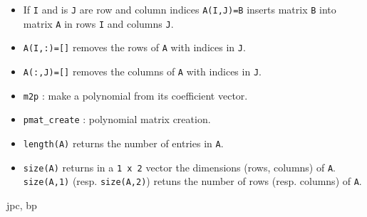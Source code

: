 \begin{itemize}
   \item If \verb+I+ and is \verb+J+ are row and column indices \verb+A(I,J)=B+ inserts
     matrix \verb+B+ into matrix \verb+A+ in rows \verb+I+ and columns \verb!J!.
   \item \verb+A(I,:)=[]+ removes the rows of \verb+A+ with indices in \verb+J+.
   \item \verb+A(:,J)=[]+ removes the columns of \verb+A+ with indices in \verb+J+.
\end{itemize}

\begin{itemize}
   \item \verb+m2p+ : make a polynomial from its coefficient vector.
   \item \verb+pmat_create+ : polynomial matrix creation.
   \item \verb+length(A)+ returns the number of entries in \verb+A+.
   \item \verb+size(A)+ returns in a \verb+1 x 2+ vector the dimensions (rows, columns)
     of \verb+A+. \verb+size(A,1)+ (resp. \verb+size(A,2)+) retuns the number of rows 
     (resp. columns) of \verb+A+.
\end{itemize}

\begin{manseealso}

\end{manseealso}

\begin{authors}
   jpc, bp
\end{authors}
